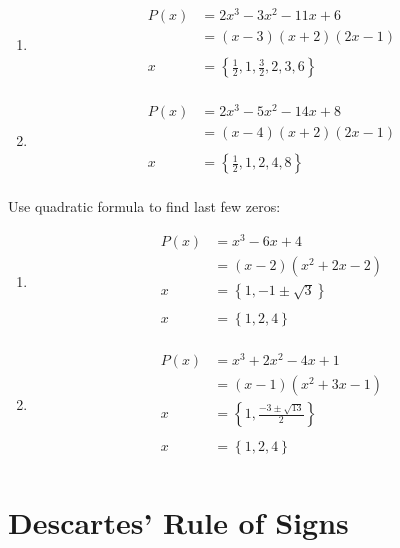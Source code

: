 \documentclass{exam}
\begin{document}
\begin{enumerate}
    \item 
      \begin{align*}
        P(x) &= 2x^3 - 3x^2 - 11x + 6 \\
             &= (x-3) (x+2) (2x-1) \\
        \\
        x    &= \left\{ \frac{1}{2}, 1, \frac{3}{2}, 2, 3, 6 \right\} \\
      \end{align*}

    \item 
      \begin{align*}
        P(x) &= 2x^3 - 5x^2 - 14x + 8 \\
             &= (x - 4) (x + 2) (2x - 1) \\
        \\
        x    &= \left\{ \frac{1}{2}, 1, 2, 4, 8 \right\} \\
      \end{align*}

  \end{enumerate}

  Use quadratic formula to find last few zeros:
  \begin{enumerate}
    \item 
      \begin{align*}
        P(x)    &= x^3 - 6x + 4 \\
                &= (x - 2) (x^2 + 2x - 2) \\
        x       &= \left\{ 1, -1 \pm \sqrt{3} \right\} \\
        \\
        x       &= \left\{ 1, 2, 4 \right\} \\
      \end{align*}

    \item 
      \begin{align*}
        P(x)    &= x^3 + 2x^2 - 4x + 1 \\
                &= (x - 1) (x^2 + 3 x - 1) \\
        x       &= \left\{ 1, \frac{-3 \pm \sqrt{13}}{2} \right\} \\
        \\
        x       &= \left\{ 1, 2, 4 \right\} \\
      \end{align*}
  \end{enumerate}

  \section{Descartes' Rule of Signs}
\end{document}
